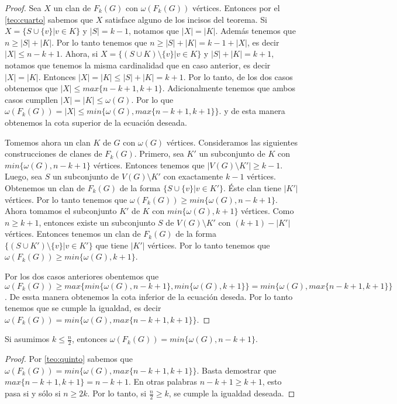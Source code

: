     \begin{proof}
        Sea $X$ un clan de $F_k(G)$ con $\omega(F_k(G))$ v\'ertices. Entonces
        por el \cref{teo:cuarto} sabemos que $X$ satisface alguno de los incisos
        del teorema. Si $X = \{S \cup \{v\}| v \in K\}$ y $|S| = k-1$, notamos
        que $|X| = |K|$. Adem\'as tenemos que $n \geq |S| + |K|$. Por lo tanto
        tenemos que $n \geq |S| + |K| = k-1 + |X|$, es decir $|X| \leq n-k+1$.
        Ahora, si $X = \{(S\cup K) \setminus \{v\}| v \in K \}$ y $|S| + |K| =
        k+1$, notamos que tenemos la misma cardinalidad que en caso anterior, es
        decir $|X| =|K|$. Entonces $|X| = |K| \leq |S| + |K| = k+1$. Por lo
        tanto, de los dos casos obtenemos que $|X| \leq max\{n-k+1, k+1\}$.
        Adicionalmente tenemos que ambos casos cumpllen $|X| = |K| \leq
        \omega(G)$. Por lo que $\omega(F_k(G)) = |X| \leq min \{\omega(G), max
        \{n-k+1, k+1\}\}$. y de esta manera obtenemos la cota superior de la
        ecuaci\'on deseada.

        Tomemos ahora un clan $K$ de $G$ con $\omega(G)$ v\'ertices.
        Consideramos las siguientes construcciones de clanes de $F_k(G)$.
        Primero, sea $K'$ un subconjunto de $K$ con $min\{\omega(G),n-k+1\}$
        v\'ertices. Entonces tenemos que $|V(G) \setminus K'| \geq k-1$. Luego,
        sea $S$ un subconjunto de $V(G) \setminus K'$ con exactamente $k-1$
        v\'ertices. Obtenemos un clan de $F_k(G)$ de la forma $\{ S \cup \{v\}|v
        \in K'\}$. \'Este clan tiene $|K'|$ v\'ertices. Por lo tanto tenemos que
        $\omega(F_k(G)) \geq min \{\omega(G), n-k+1\}$. Ahora tomamos el
        subconjunto $K'$ de $K$ con $min \{ \omega(G), k+1\}$ v\'ertices. Como
        $n \geq k+1$, entonces existe un subconjunto $S$ de $V(G) \setminus K'$
        con $(k+1)-|K'|$ v\'ertices. Entonces tenemos un clan de $F_k(G)$ de la
        forma $\{ (S \cup K') \setminus \{v\}|v \in K'\}$ que tiene $|K'|$
        v\'ertices. Por lo tanto tenemos que $\omega(F_k(G)) \geq min
        \{\omega(G), k+1\}$.

        Por los dos casos anteriores obentemos que $\omega(F_k(G)) \geq max
        \{min \{\omega(G), n-k+1\}, min \{\omega(G), k+1 \}\} = min \{\omega(G),
        max \{n-k+1,k+1\}\}$. De essta manera obtenemos la cota inferior de la
        ecuaci\'on deseda. Por lo tanto tenemos que se cumple la igualdad, es
        decir  $\omega(F_k(G))= min \{\omega(G), max \{n-k+1,k+1\}\}$.
    \end{proof}

    \begin{corolario}
        Si asumimos $k \leq \frac{n}{2}$, entonces $\omega(F_k(G))= min
        \{\omega(G), n-k+1\}$.
    \end{corolario}

    \begin{proof}
        Por \cref*{teo:quinto} sabemos que $\omega(F_k(G))= min \{\omega(G), max
        \{n-k+1,k+1\}\}$. Basta demostrar que $max \{n-k+1, k+1\} = n-k+1$. En
        otras palabras $n-k+1 \geq k+1$, esto pasa si y s\'olo si $n \geq 2k$.
        Por lo tanto, si $\frac{n}{2} \geq k$, se cumple la igualdad deseada.
    \end{proof}